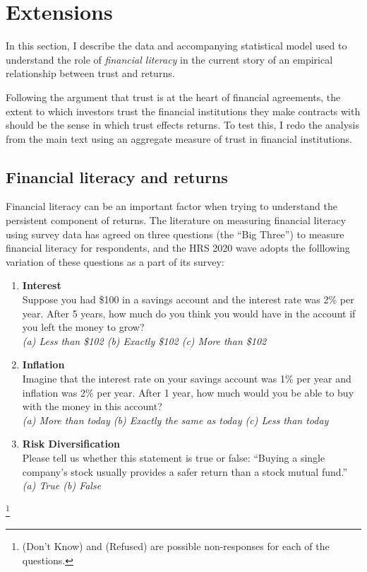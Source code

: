 \onlyinsubfile{\setcounter{section}{5}}
\section{Extensions}\notinsubfile{\label{sec:exts}}

\par In this section, I describe the data and accompanying statistical model used to understand the role of \textit{financial literacy} in the current story of an empirical relationship between trust and returns.

\par Following the argument that trust is at the heart of financial agreements, the extent to which investors trust the financial institutions they make contracts with should be the sense in which trust effects returns. To test this, I redo the analysis from the main text using an aggregate measure of trust in financial institutions. 

\subsection{Financial literacy and returns}

\par Financial literacy can be an important factor when trying to understand the persistent component of returns. The literature on measuring financial literacy using survey data has agreed on three questions (the ``Big Three'') to measure financial literacy for respondents, and the HRS 2020 wave adopts the folllowing variation of these questions as a part of its survey:

\begin{enumerate}
    \item \textbf{Interest} \\
    Suppose you had \$100 in a savings account and the interest rate was 2\% per year. After 5 years, how much do you think you would have in the account if you left the money to grow? \\
    \textit{(a) Less than \$102 \quad (b) Exactly \$102 \quad (c) More than \$102}
    
    \item \textbf{Inflation} \\
    Imagine that the interest rate on your savings account was 1\% per year and inflation was 2\% per year. After 1 year, how much would you be able to buy with the money in this account? \\
    \textit{(a) More than today \quad (b) Exactly the same as today \quad (c) Less than today}
    
    \item \textbf{Risk Diversification} \\
    Please tell us whether this statement is true or false: ``Buying a single company's stock usually provides a safer return than a stock mutual fund.'' \\
    \textit{(a) True \quad (b) False}
  \end{enumerate}\footnote{ (Don't Know) and  (Refused) are possible non-responses for each of the questions.}

